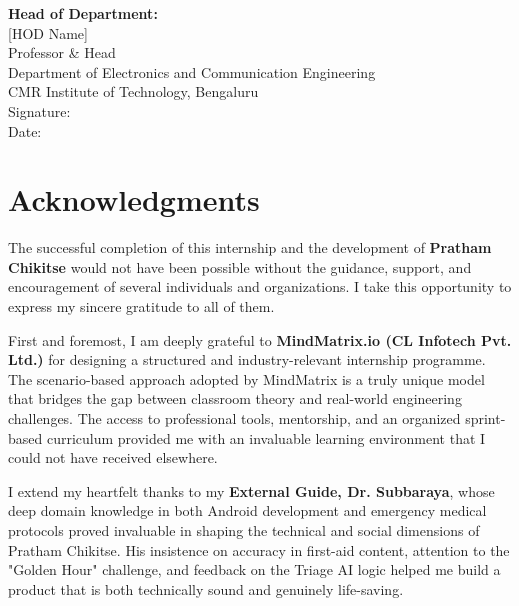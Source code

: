 \documentclass[12pt,a4paper]{report}
\begin{document}
\vspace{2cm}
\noindent
\textbf{Head of Department:} \\[0.3cm]
[HOD Name] \\
Professor \& Head \\
Department of Electronics and Communication Engineering \\
CMR Institute of Technology, Bengaluru \\[1cm]
Signature: \underline{\hspace{4cm}} \\
Date: \underline{\hspace{4cm}}

\newpage

\chapter*{Acknowledgments}

The successful completion of this internship and the development of \textbf{Pratham Chikitse} would not have been possible without the guidance, support, and encouragement of several individuals and organizations. I take this opportunity to express my sincere gratitude to all of them.

\vspace{0.4cm}

First and foremost, I am deeply grateful to \textbf{MindMatrix.io (CL Infotech Pvt. Ltd.)} for designing a structured and industry-relevant internship programme. The scenario-based approach adopted by MindMatrix is a truly unique model that bridges the gap between classroom theory and real-world engineering challenges. The access to professional tools, mentorship, and an organized sprint-based curriculum provided me with an invaluable learning environment that I could not have received elsewhere.

\vspace{0.4cm}

I extend my heartfelt thanks to my \textbf{External Guide, Dr. Subbaraya}, whose deep domain knowledge in both Android development and emergency medical protocols proved invaluable in shaping the technical and social dimensions of Pratham Chikitse. His insistence on accuracy in first-aid content, attention to the "Golden Hour" challenge, and feedback on the Triage AI logic helped me build a product that is both technically sound and genuinely life-saving.
\end{document}
